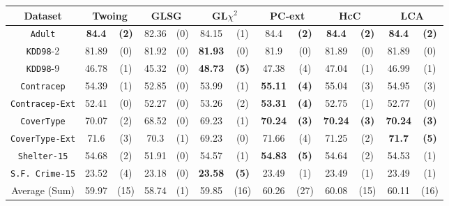 \begin{table}
\scriptsize
\centering
\begin{tabular}{c|cc|cc|cc|cc|cc|cc} 
Dataset            &\multicolumn{2}{c|}{Twoing} & \multicolumn{2}{c|}{GLSG} & \multicolumn{2}{c|}{GL$\chi^2$} & \multicolumn{2}{c|}{PC-ext}& \multicolumn{2}{c|}{HcC} & \multicolumn{2}{c}{LCA} \\
\hline   
{\tt Adult}        & {\bf 84.4 }    & {\bf (2)} & 82.36      & (0)          &  84.15      &  (1)              & 84.4        & {\bf (2)}    & {\bf 84.4 } & {\bf (2)} & {\bf 84.4 } & {\bf (2)} \\
{\tt KDD98}-2      & 81.89          & (0)       & 81.92      & (0)          & {\bf 81.93} &  (0)              & 81.9        & (0)          & 81.89       & (0)       & 81.89       & (0)       \\ 
{\tt KDD98}-9      & 46.78          & (1)       & 45.32      & (0)          & {\bf 48.73} & {\bf (5)}         &  47.38      & (4)          & 47.04       & (1)       & 46.99       & (1)       \\ 
{\tt Contracep}    & 54.39          & (1)       & 52.85      & (0)          & 53.99       & (1)               & {\bf 55.11} & {\bf (4)}    & 55.04       & (3)       & 54.95       & (3)       \\  
{\tt Contracep-Ext}& 52.41          & (0)       & 52.27      & (0)          & 53.26       & (2)               & {\bf 53.31} & {\bf (4)}    & 52.75       & (1)       & 52.77       & (0)       \\
{\tt CoverType}    & 70.07          & (2)       & 68.52      & (0)          & 69.23       & (1)               & {\bf 70.24} & {\bf (3)}    & {\bf 70.24} & {\bf (3)} & {\bf 70.24} & {\bf (3)} \\  
{\tt CoverType-Ext}& 71.6           & (3)       & 70.3       & (1)          & 69.23       & (0)               & 71.66       & (4)          & 71.25       & (2)       & {\bf 71.7 } & {\bf (5)} \\ 
{\tt Shelter-15}   & 54.68          & (2)       & 51.91      & (0)          & 54.57       & (1)               & {\bf 54.83} & {\bf (5)}    & 54.64       & (2)       & 54.53       & (1)       \\   
{\tt S.F. Crime-15}& 23.52          & (4)       & 23.18      & (0)          & {\bf 23.58} & {\bf (5)}         & 23.49       & (1)          & 23.49       & (1)       & 23.49       & (1)       \\ 
\hline
Average (Sum)      & 59.97          & (15)      & 58.74      & (1)          & 59.85       & (16)              & 60.26       & (27)         & 60.08       & (15)      & 60.11       & (16)


\end{tabular}
\end{table}
